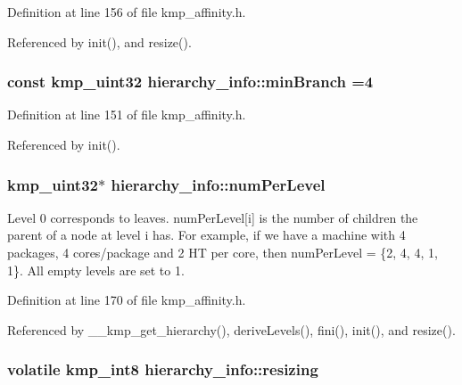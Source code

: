 Definition at line 156 of file kmp\-\_\-affinity.\-h.



Referenced by init(), and resize().

\hypertarget{classhierarchy__info_afe34e439673297d9ac44c43722c042f0}{
\subsubsection[{min\-Branch}]{\setlength{\rightskip}{0pt plus 5cm}const kmp\-\_\-uint32 hierarchy\-\_\-info\-::min\-Branch =4\hspace{0.3cm}{\ttfamily [static]}}}\label{classhierarchy__info_afe34e439673297d9ac44c43722c042f0}


Definition at line 151 of file kmp\-\_\-affinity.\-h.



Referenced by init().

\hypertarget{classhierarchy__info_a12fc455d853883d91e3a19567aaac3fe}{
\subsubsection[{num\-Per\-Level}]{\setlength{\rightskip}{0pt plus 5cm}kmp\-\_\-uint32$\ast$ hierarchy\-\_\-info\-::num\-Per\-Level}}\label{classhierarchy__info_a12fc455d853883d91e3a19567aaac3fe}
Level 0 corresponds to leaves. num\-Per\-Level\mbox{[}i\mbox{]} is the number of children the parent of a node at level i has. For example, if we have a machine with 4 packages, 4 cores/package and 2 H\-T per core, then num\-Per\-Level = \{2, 4, 4, 1, 1\}. All empty levels are set to 1. 

Definition at line 170 of file kmp\-\_\-affinity.\-h.



Referenced by \-\_\-\-\_\-kmp\-\_\-get\-\_\-hierarchy(), derive\-Levels(), fini(), init(), and resize().

\hypertarget{classhierarchy__info_afa2edd0b49e3c69a50f3bbebfbd4ad77}{
\subsubsection[{resizing}]{\setlength{\rightskip}{0pt plus 5cm}volatile kmp\-\_\-int8 hierarchy\-\_\-info\-::resizing}}\label{classhierarchy__info_afa2edd0b49e3c69a50f3bbebfbd4ad77}


